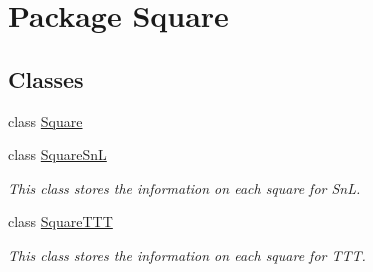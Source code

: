 \hypertarget{namespace_square}{}\section{Package Square}
\label{namespace_square}
\subsection*{Classes}
\begin{DoxyCompactItemize}
\item 
class \hyperlink{class_square_1_1_square}{Square}
\item 
class \hyperlink{class_square_1_1_square_sn_l}{Square\+Sn\+L}
\begin{DoxyCompactList}\small\item\em This class stores the information on each square for Sn\+L. \end{DoxyCompactList}\item 
class \hyperlink{class_square_1_1_square_t_t_t}{Square\+T\+T\+T}
\begin{DoxyCompactList}\small\item\em This class stores the information on each square for T\+T\+T. \end{DoxyCompactList}\end{DoxyCompactItemize}
